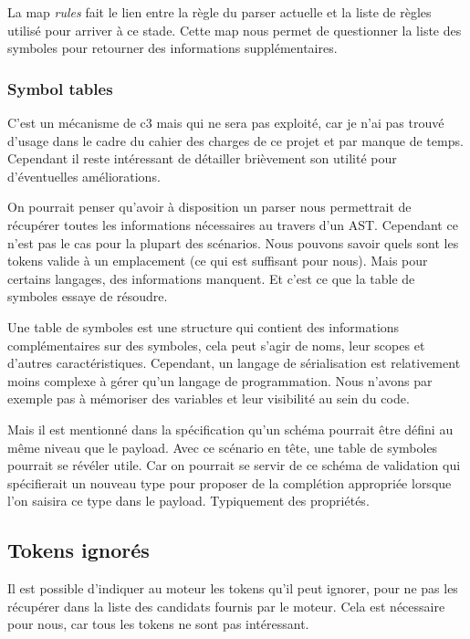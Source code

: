 \documentclass[
    iict, %
    il, %
]{heig-tb}
\begin{document}
La map \emph{rules} fait le lien entre la règle du parser actuelle et la liste de règles utilisé pour arriver à ce stade.
Cette map nous permet de questionner la liste des symboles pour retourner des informations supplémentaires.

\subsubsection{Symbol tables}\label{Symbol tables}

C'est un mécanisme de c3 mais qui ne sera pas exploité, car je n'ai pas trouvé d'usage dans le cadre du cahier des charges de ce projet et par manque de temps.
Cependant il reste intéressant de détailler brièvement son utilité pour d'éventuelles améliorations.

On pourrait penser qu'avoir à disposition un parser nous permettrait de récupérer toutes les informations nécessaires au travers d'un AST.
Cependant ce n'est pas le cas pour la plupart des scénarios.
Nous pouvons savoir quels sont les tokens valide à un emplacement (ce qui est suffisant pour nous). Mais pour certains langages, des informations manquent.
Et c'est ce que la table de symboles essaye de résoudre.

Une table de symboles est une structure qui contient des informations complémentaires sur des symboles, cela peut s'agir de noms, leur scopes et d'autres caractéristiques.
Cependant, un langage de sérialisation est relativement moins complexe à gérer qu'un langage de programmation.
Nous n'avons par exemple pas à mémoriser des variables et leur visibilité au sein du code.

Mais il est mentionné dans la spécification qu'un schéma pourrait être défini au même niveau que le payload.
Avec ce scénario en tête, une table de symboles pourrait se révéler utile. Car on pourrait se servir de ce schéma de validation qui spécifierait un nouveau type pour proposer de la complétion appropriée
lorsque l'on saisira ce type dans le payload. Typiquement des propriétés.

\subsection{Tokens ignorés}

Il est possible d'indiquer au moteur les tokens qu'il peut ignorer, pour ne pas les récupérer dans la liste des candidats fournis par le moteur.
Cela est nécessaire pour nous, car tous les tokens ne sont pas intéressant.
\end{document}
